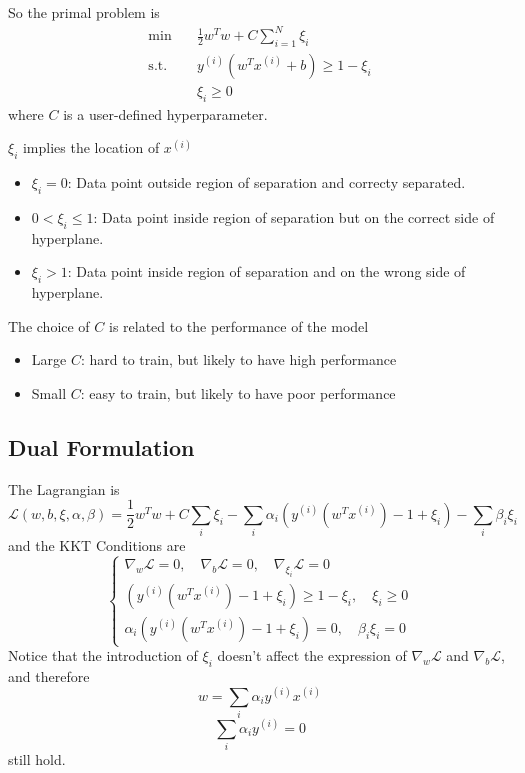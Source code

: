         So the primal problem is
        \begin{align*}
            \min \quad & \frac{1}{2}w^Tw + C\sum_{i=1}^N\xi_i\\
            \text{s.t.} \quad &y^{(i)}(w^Tx^{(i)} + b) \ge 1 - \xi_i\\
            \quad & \xi_i \ge 0
        \end{align*}
        where $C$ is a user-defined hyperparameter.
        \begin{remark}
            $\xi_i$ implies the location of $x^{(i)}$
            \begin{itemize}
                \item $\xi_i = 0$: Data point outside region of separation and correcty separated.
                \item $0 < \xi_i \le 1$: Data point inside region of separation but on the correct side of hyperplane.
                \item $\xi_i > 1$: Data point inside region of separation and on the wrong side of hyperplane.
            \end{itemize}
            The choice of $C$ is  related to the performance of the model
            \begin{itemize}
                \item Large $C$: hard to train, but likely to have high performance
                \item Small $C$: easy to train, but likely to have poor performance
            \end{itemize}
        \end{remark}
    
    \subsection{Dual Formulation}
    The Lagrangian is
    \[ \mathcal{L}(w,b,\xi,\alpha,\beta) = \frac{1}{2}w^Tw + C\sum_{i}\xi_i - \sum_i \alpha_i(y^{(i)}(w^Tx^{(i)})-1+\xi_i) - \sum_i \beta_i\xi_i \]
    and the KKT Conditions are
    \[
    \begin{cases}
        \nabla_w\mathcal{L} = 0, \quad \nabla_b\mathcal{L} = 0, \quad \nabla_{\xi_i}\mathcal{L} = 0\\
        (y^{(i)}(w^Tx^{(i)})-1+\xi_i) \ge 1-\xi_i, \quad \xi_i \ge 0\\
        \alpha_i(y^{(i)}(w^Tx^{(i)})-1+\xi_i) = 0, \quad \beta_i\xi_i = 0
    \end{cases}    
    \]
    Notice that the introduction of $\xi_i$ doesn't affect the expression of $\nabla_w\mathcal{L}$ and $\nabla_b\mathcal{L}$, and therefore
    \[ w = \sum_i \alpha_iy^{(i)}x^{(i)} \]
    \[ \sum_i \alpha_i y^{(i)} = 0 \]
    still hold.

